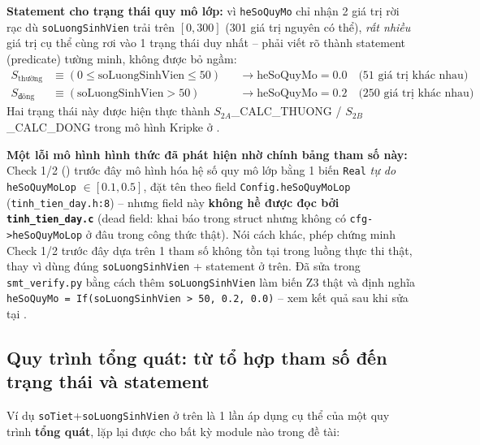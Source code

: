 \textbf{Statement cho trạng thái quy mô lớp:} vì \texttt{heSoQuyMo} chỉ nhận 2 giá trị rời rạc dù \texttt{soLuongSinhVien} trải trên $[0,300]$ (301 giá trị nguyên có thể), \emph{rất nhiều} giá trị cụ thể cùng rơi vào 1 trạng thái duy nhất -- phải viết rõ thành statement (predicate) tường minh, không được bỏ ngầm:
\begin{align*}
  S_{\text{thường}} &\equiv (0 \le \text{soLuongSinhVien} \le 50) &&\to \text{heSoQuyMo} = 0.0 \quad \text{(51 giá trị khác nhau)} \\
  S_{\text{đông}} &\equiv (\text{soLuongSinhVien} > 50) &&\to \text{heSoQuyMo} = 0.2 \quad \text{(250 giá trị khác nhau)}
\end{align*}
Hai trạng thái này được hiện thực thành $S_{2A}$\_CALC\_THUONG / $S_{2B}$\_CALC\_DONG trong mô hình Kripke ở .

\textbf{Một lỗi mô hình hình thức đã phát hiện nhờ chính bảng tham số này:} Check 1/2 () trước đây mô hình hóa hệ số quy mô lớp bằng 1 biến \texttt{Real} \emph{tự do} \texttt{heSoQuyMoLop} $\in[0.1,0.5]$, đặt tên theo field \texttt{Config.heSoQuyMoLop} (\texttt{tinh\_tien\_day.h:8}) -- nhưng field này \textbf{không hề được đọc bởi \texttt{tinh\_tien\_day.c}} (dead field: khai báo trong struct nhưng không có \texttt{cfg->heSoQuyMoLop} ở đâu trong công thức thật). Nói cách khác, phép chứng minh Check 1/2 trước đây dựa trên 1 tham số không tồn tại trong luồng thực thi thật, thay vì dùng đúng \texttt{soLuongSinhVien} + statement ở trên. Đã sửa trong \texttt{smt\_verify.py} bằng cách thêm \texttt{soLuongSinhVien} làm biến Z3 thật và định nghĩa \texttt{heSoQuyMo = If(soLuongSinhVien > 50, 0.2, 0.0)} -- xem kết quả sau khi sửa tại .

\subsection{Quy trình tổng quát: từ tổ hợp tham số đến trạng thái và statement}
\label{sec:quytrinh}

Ví dụ \texttt{soTiet}+\texttt{soLuongSinhVien} ở trên là 1 lần áp dụng cụ thể của một quy trình \textbf{tổng quát}, lặp lại được cho bất kỳ module nào trong đề tài:

